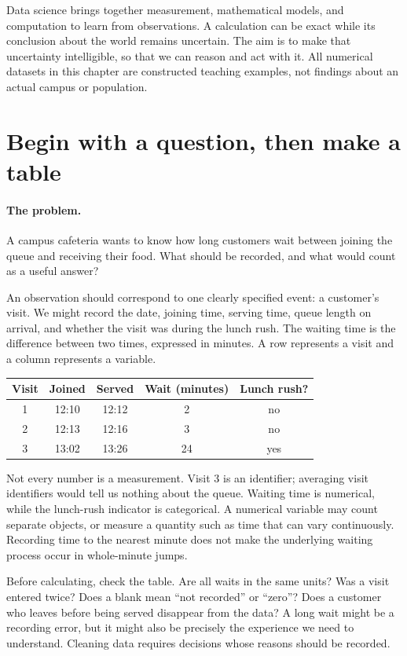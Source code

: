 Data science brings together measurement, mathematical models, and
computation to learn from observations. A calculation can be exact while
its conclusion about the world remains uncertain. The aim is to make that
uncertainty intelligible, so that we can reason and act with it.
All numerical datasets in this chapter are constructed teaching examples,
not findings about an actual campus or population.

\section{Begin with a question, then make a table}
\label{sec:ds-data}
\paragraph{The problem.}
A campus cafeteria wants to know how long customers wait between joining
the queue and receiving their food. What should be recorded, and what
would count as a useful answer?

An observation should correspond to one clearly specified event: a
customer's visit. We might record the date, joining time, serving time,
queue length on arrival, and whether the visit was during the lunch rush.
The waiting time is the difference between two times, expressed in minutes.
A row represents a visit and a column represents a variable.
\begin{center}
\begin{tabular}{ccccc}
\toprule
Visit & Joined & Served & Wait (minutes) & Lunch rush?\\
\midrule
1 & 12:10 & 12:12 & 2 & no\\
2 & 12:13 & 12:16 & 3 & no\\
3 & 13:02 & 13:26 & 24 & yes\\
\bottomrule
\end{tabular}
\end{center}

Not every number is a measurement. Visit 3 is an identifier; averaging
visit identifiers would tell us nothing about the queue. Waiting time is
numerical, while the lunch-rush indicator is categorical. A numerical
variable may count separate objects, or measure a quantity such as time
that can vary continuously. Recording time to the nearest minute does
not make the underlying waiting process occur in whole-minute jumps.

Before calculating, check the table. Are all waits in the same units?
Was a visit entered twice? Does a blank mean ``not recorded'' or ``zero''?
Does a customer who leaves before being served disappear from the data?
A long wait might be a recording error, but it might also be precisely the
experience we need to understand. Cleaning data requires decisions whose
reasons should be recorded.

